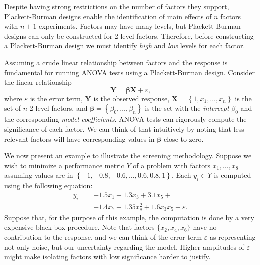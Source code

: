 \documentclass[conference]{IEEEtran}
\begin{document}
Despite having strong restrictions on the number of factors they support,
Plackett-Burman designs enable the identification of main effects of \(n\) factors
with \(n + 1\) experiments. Factors may have many levels, but Plackett-Burman
designs can only be constructed for 2-level factors. Therefore, before
constructing a Plackett-Burman design we must identify \emph{high} and \emph{low} levels
for each factor.

Assuming a crude linear relationship between factors and the response is
fundamental for running ANOVA tests using a Plackett-Burman design. Consider the
linear relationship
\vspace{-5pt}
{\normalsize
\begin{equation}
\mathbf{Y} = \bm{\beta}\mathbf{X} + \varepsilon\text{,}
\label{eq:linear_assumption}
\end{equation}\noindent
}\noindent
\vspace{-1pt}
where \(\varepsilon\) is the error term, \(\mathbf{Y}\) is the observed response,
\(\mathbf{X} = \left\{1, x_1,\dots,x_n\right\}\) is the set of \(n\) 2-level
factors, and \(\bm{\beta} = \left\{\beta_0,\dots,\beta_n\right\}\) is the set with
the \emph{intercept} \(\beta_0\) and the corresponding \emph{model coefficients}. ANOVA
tests can rigorously compute the significance of each factor. We can think of
that intuitively by noting that less relevant factors will have corresponding
values in \(\bm{\beta}\) close to zero.

We now present an example to illustrate the screening methodology. Suppose we
wish to minimize a performance metric \(Y\) of a problem with factors
\(x_1,\dots,x_8\) assuming values are in \(\left\{-1, -0.8, -0.6, \dots, 0.6, 0.8,
1\right\}\). Each \(y_i \in Y\) is computed using the following equation:
\vspace{-5pt}
{\normalsize
\begin{align}
\label{eq:real_model}
y_i = & -1.5x_1 + 1.3x_3 + 3.1x_5 + \\
& -1.4x_7 + 1.35x_8^2 + 1.6x_3x_5 + \varepsilon. \nonumber
\end{align}\noindent
}\noindent
\vspace{-1pt}
Suppose that, for the purpose of this example, the computation is done by a very
expensive black-box procedure. Note that factors \(\{x_2,x_4,x_6\}\) have no
contribution to the response, and we can think of the error term \(\varepsilon\)
as representing not only noise, but our uncertainty regarding the model. Higher
amplitudes of \(\varepsilon\) might make isolating factors with low significance
harder to justify.
\end{document}
